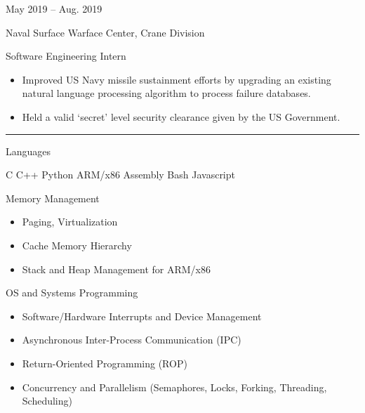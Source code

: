 \documentclass[a4paper]{article}
\newlength{\cvcolumngapwidth}
\newlength{\cvleftcolumnwidth}
\newlength{\cvrightcolumnwidth}
\newcommand{\cvsectionstyle}[1]{{\normalsize\cvsectionfont\textcolor{cvsectioncolor}{#1}}}
\newcommand{\cvtitlestyle}[1]{{\large\cvtitlefont\textcolor{cvtitlecolor}{#1}}}
\newcommand{\cvdurationstyle}[1]{{\small\cvdurationfont\textcolor{cvdurationcolor}{#1}}}
\newcommand{\cvheadingstyle}[1]{{\normalsize\cvheadingfont\textcolor{cvheadingcolor}{#1}}}
\newcommand{\italicstyle}[1]{{\small\italicfont\textcolor{cvsectioncolor}{#1}}}
\newlength{\cvafteritemskipamount}
\newlength{\cvaftersectionskipamount}
\newlength{\cvaftertitleskipamount}
\newlength{\cvparskip}
\newcommand{\cvsection}[1]{
    \begin{minipage}[t]{\cvleftcolumnwidth}
        \raggedleft\cvsectionstyle{#1}
    \end{minipage}%
    \hspace{\cvcolumngapwidth}%
    \begin{minipage}[t]{\cvrightcolumnwidth}
        \textcolor{cvrulecolor}{\rule{\cvrightcolumnwidth}{0.3mm}}
    \end{minipage}

    \vspace{\cvaftersectionskipamount}
}
\newcommand{\cvitem}[2]{
    \begin{minipage}[t]{\cvleftcolumnwidth}
        \raggedleft #1
    \end{minipage}%
    \hspace{\cvcolumngapwidth}%
    \begin{minipage}[t]{\cvrightcolumnwidth}
        \setlength{\parskip}{\cvparskip} #2
    \end{minipage}

    \vspace{\cvafteritemskipamount}
}
\newcommand{\cvtitle}[1]{
    \cvtitlestyle{#1}

    \vspace{\cvaftertitleskipamount}
    \vspace{-\cvparskip}
}
\begin{document}
\cvitem{
    \cvdurationstyle{May 2019 -- Aug. 2019}
}{

    \cvtitle{Naval Surface Warface Center, Crane Division}

    \italicstyle{Software Engineering Intern}

    \normalsize
    \begin{itemize}[leftmargin=*]
        \item Improved US Navy missile sustainment efforts by upgrading an existing
natural language processing algorithm to process failure databases.
        \item Held a valid ‘secret’ level security clearance given by the US Government.
    \end{itemize}
}


\cvsection{\LARGE \textcolor{emphasiscolor}{EXPERTISE}}

\cvitem{
    \cvheadingstyle{Languages}
}{
  C \hspace{12mm} C++ \hspace{12mm} Python \hspace{12mm} ARM/x86 Assembly \hspace{12mm} Bash \hspace{12mm} Javascript
  \vspace{1mm}
}

\cvitem{
    \cvheadingstyle{Memory Management}
}{
    \begin{itemize}[leftmargin=*]
      \item Paging, Virtualization
      \item Cache Memory Hierarchy
      \item Stack and Heap Management for ARM/x86
    \end{itemize}
  \vspace{1.5mm}
}

\cvitem{
    \cvheadingstyle{OS and Systems Programming}
}{
    \begin{itemize}[leftmargin=*]
      \item Software/Hardware Interrupts and Device Management
      \item Asynchronous Inter-Process Communication (IPC)
      \item Return-Oriented Programming (ROP)
      \item Concurrency and Parallelism (Semaphores, Locks, Forking, Threading, Scheduling)
    \end{itemize}
  \vspace{1.5mm}
}
\end{document}

